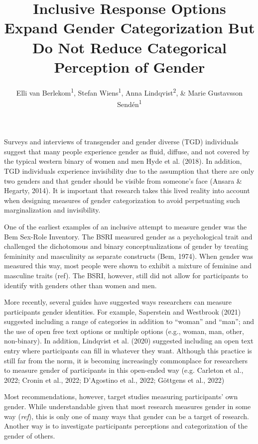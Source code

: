 \documentclass[
  man]{apa7}
\title{Inclusive Response Options Expand Gender Categorization But Do Not Reduce Categorical Perception of Gender}
\author{Elli van Berlekom\textsuperscript{1}, Stefan Wiens\textsuperscript{1}, Anna Lindqvist\textsuperscript{2}, \& Marie Gustavsson Sendén\textsuperscript{1}}
\date{}
\affiliation{\vspace{0.5cm}\textsuperscript{1} Stockholm University\\\textsuperscript{2} Lund University}
\begin{document}
\maketitle

Surveys and interviews of transgender and gender diverse (TGD) individuals suggest that many people experience gender as fluid, diffuse, and not covered by the typical western binary of women and men Hyde et al. (2018). In addition, TGD individuals experience invisibility due to the assumption that there are only two genders and that gender should be visible from someone's face (Ansara \& Hegarty, 2014). It is important that research takes this lived reality into account when designing measures of gender categorization to avoid perpetuating such marginalization and invisibility.

One of the earliest examples of an inclusive attempt to measure gender was the Bem Sex-Role Inventory. The BSRI measured gender as a psychological trait and challenged the dichotomous and binary conceptualizations of gender by treating femininity and masculinity as separate constructs (Bem, 1974). When gender was measured this way, most people were shown to exhibit a mixture of feminine and masculine traits (ref). The BSRI, however, still did not allow for participants to identify with genders other than women and men.

More recently, several guides have suggested ways researchers can measure participants gender identities. For example, Saperstein and Westbrook (2021) suggested including a range of categories in addition to ``woman'' and ``man''; and the use of open free text options or multiple options (e.g., woman, man, other, non-binary). In addition, Lindqvist et al. (2020) suggested including an open text entry where participants can fill in whatever they want. Although this practice is still far from the norm, it is becoming increasingly commonplace for researchers to measure gender of participants in this open-ended way (e.g. Carleton et al., 2022; Cronin et al., 2022; D'Agostino et al., 2022; Göttgens et al., 2022)

Most recommendations, however, target studies measuring participants' own gender. While understandable given that most research measures gender in some way (\emph{ref}), this is only one of many ways that gender can be a target of research. Another way is to investigate participants perceptions and categorization of the gender of others.
\end{document}
